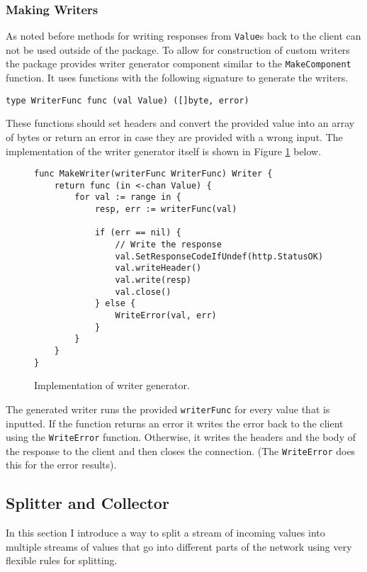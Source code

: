 \subsubsection{Making Writers}
As noted before methods for writing responses from \texttt{Value}s 
back to the client can not be used outside of the package. To allow
for construction of custom writers the package provides writer generator
component similar to the \texttt{MakeComponent} function. It uses 
functions with the following signature to generate the writers.
\begin{lstlisting}
type WriterFunc func (val Value) ([]byte, error)
\end{lstlisting}
These functions should set headers and convert the provided value into 
an array of bytes or return an error in case they are provided with a 
wrong input. The implementation of the writer generator itself is shown
in Figure \ref{fig:MakeWriter} below.
\begin{figure}[h]
\centering
\begin{lstlisting}
func MakeWriter(writerFunc WriterFunc) Writer {
    return func (in <-chan Value) {
        for val := range in {
            resp, err := writerFunc(val)

            if (err == nil) {
                // Write the response
                val.SetResponseCodeIfUndef(http.StatusOK)
                val.writeHeader()
                val.write(resp)
                val.close()
            } else {
                WriteError(val, err)
            }
        }       
    }
}
\end{lstlisting}
\caption[scale=1.0]{Implementation of writer generator.}
\label{fig:MakeWriter}
\end{figure}

The generated writer runs the provided \texttt{writerFunc} for every value 
that is inputted. If the function returns an error it writes the error 
back to the client using the \texttt{WriteError} function. Otherwise, it 
writes the headers and the body of the response to the client and then 
closes the connection. (The \texttt{WriteError} does this for the error
results).

\subsection{Splitter and Collector}
In this section I introduce a way to split a stream of incoming values into
multiple streams of values that go into different parts of the network
using very flexible rules for splitting.


